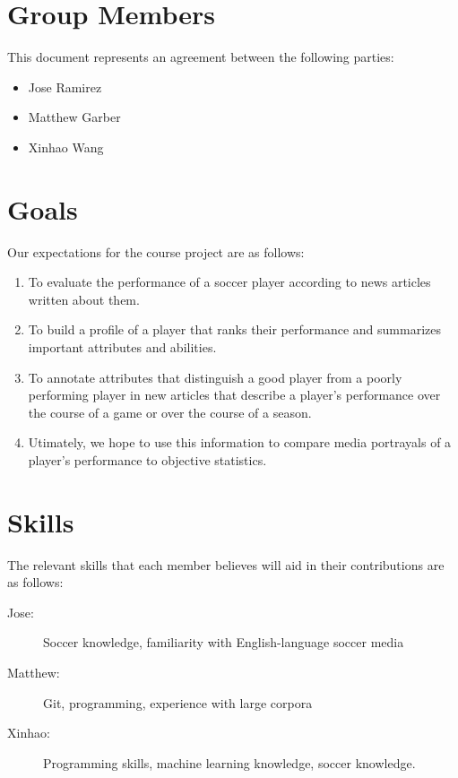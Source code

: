 \documentclass{article}
\newcommand{\groupmember}[1]{#1}
\begin{document}
\section{Group Members} %
\label{par:group_members}
This document represents an agreement between the following parties:
\begin{itemize}
    \item \groupmember{Jose Ramirez}
    \item \groupmember{Matthew Garber}
    \item \groupmember{Xinhao Wang}
\end{itemize}

\section{Goals} %
\label{par:expectations}
Our expectations for the course project are as follows:
\begin{enumerate}
    \item To evaluate the performance of a soccer player according to news articles written about them.
    \item To build a profile of a player that ranks their performance and summarizes important attributes and abilities.
    \item To annotate attributes that distinguish a good player from a poorly performing player in new articles that describe a player's performance over the course of a game or over the course of a season.
    \item Utimately, we hope to use this information to compare media portrayals of a player's performance to objective statistics.
\end{enumerate}

\section{Skills} %
\label{sec:skills}

The relevant skills that each member believes will aid in their contributions are as follows:

\begin{description}
    \item[\groupmember{Jose}:] Soccer knowledge, familiarity with English-language soccer media
    \item[\groupmember{Matthew}:] Git, programming, experience with large corpora
    \item[\groupmember{Xinhao}:] Programming skills, machine learning knowledge, soccer knowledge.
\end{description}
\end{document}
